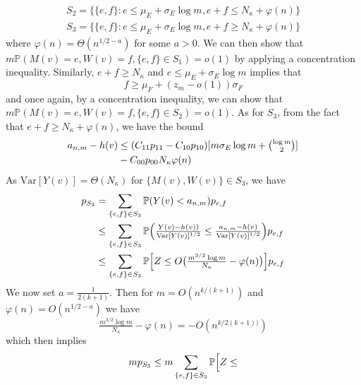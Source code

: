 \documentclass[final]{IEEEtran}
\theoremstyle{definition}
\begin{document}
\begin{IEEEproof}
\begin{IEEEproof}[Eq.~\eqref{eq:30}]
\begin{gather}
    S_2 = \{ \{e,f\} \colon  e \leq
        \mu_E + \sigma_E \log{m},e + f \leq
        N_\kappa + \varphi(n)\} \\
    S_3 = \{ \{e,f\} \colon e \leq \mu_E + \sigma_E \log{m}, e + f \geq
        N_\kappa + \varphi(n)\}
\end{gather}
where $\varphi(n) = \Theta(n^{1/2 - a})$ for some $a > 0$. We can then
show that $m\mathbb{P}(M(v) = e,
W(v) =f, \{e,f\} \in S_1) = o(1)$ by applying a concentration
inequality. Similarly, $e + f \geq N_{\kappa}$ and $e \leq \mu_{E}
+ \sigma_{E} \log{m}$ implies that
\begin{equation}
  \label{eq:33}
  f \geq \mu_{F} + (z_{m} - o(1)) \sigma_F 
\end{equation}
and once again, by a concentration inequality, we can show that $m
\mathbb{P}(M(v) = e, W(v) = f, \{e,f\} \in S_2) = o(1)$. As for
$S_3$, from the fact that $e + f \geq N_{\kappa} + \varphi(n)$, we have the bound
  \begin{equation}
    \begin{split}
    a_{n,m} - h(v) &\leq (C_{11} p_{11} - C_{10} p_{10})[m \sigma_E
    \log{m} + \tbinom{\log{m}}{2}] \\ &- C_{00}p_{00} N_\kappa \varphi(n)
    \end{split}
  \end{equation}
  As $\mathrm{Var}[Y(v)] = \Theta(N_\kappa)$ for $\{M(v), W(v)\} \in
  S_3$, we have
  \begin{equation}
    \label{eq:39}
    \begin{split}
      p_{S_3} &= \sum_{\{e,f\} \in S_3} \mathbb{P}( Y(v) < a_{n,m}) p_{e,f} 
      \\ &\leq \sum_{\{e,f\} \in S_3} \mathbb{P}\Bigl(\tfrac{Y(v) - h(v))}{\mathrm{Var}[Y(v)]^{1/2}} \leq \tfrac{a_{n,m} -
      h(v)}{\mathrm{Var}[Y(v)]^{1/2}}\Bigr)p_{e,f} \\
    &\leq \sum_{\{e,f\} \in S_3} \mathbb{P}\Bigl[Z \leq
    O\bigl(\tfrac{m^{3/2} \log m}{N_{\kappa}} - \varphi(n)\bigr)\Bigr] p_{e,f}
    \end{split}
  \end{equation}
  We now set $a = \tfrac{1}{2(k+1)}$. Then for $m =
  O(n^{k/(k+1)})$ and $\varphi(n) = O(n^{1/2 - a})$ we have
  \begin{equation}
    \label{eq:41}
    \tfrac{m^{3/2} \log m}{N_\kappa} - \varphi(n) =
    -O(n^{k/2(k+1))})
  \end{equation}
  which then implies
  \begin{equation}
    \label{eq:44}
    m p_{S_3} \leq m \sum_{\{e,f\} \in S_3} \mathbb{P} \Bigl[Z \leq

\end{equation}
\end{IEEEproof}
\end{IEEEproof}
\end{document}
